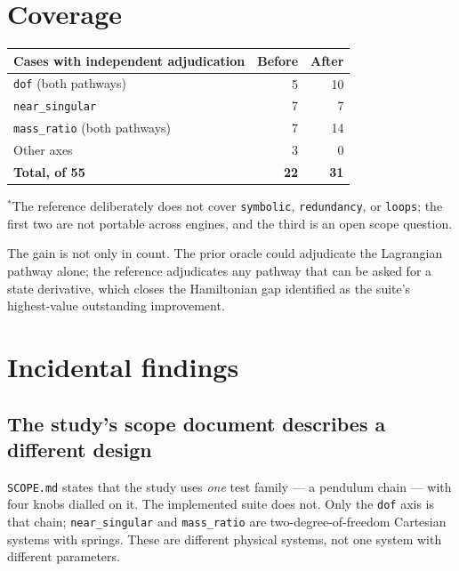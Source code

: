 \documentclass[11pt,a4paper]{article}
\begin{document}
\section{Coverage}

\begin{center}
\begin{tabular}{@{}lrr@{}}
\toprule
\textbf{Cases with independent adjudication} & \textbf{Before} & \textbf{After} \\
\midrule
\texttt{dof} (both pathways)            & 5  & 10 \\
\texttt{near\_singular}                  & 7  & 7 \\
\texttt{mass\_ratio} (both pathways)     & 7  & 14 \\
Other axes                               & 3  & 0\rlap{$^{*}$} \\
\midrule
\textbf{Total, of 55}                    & \textbf{22} & \textbf{31} \\
\bottomrule
\end{tabular}
\end{center}

{\footnotesize $^{*}$The reference deliberately does not cover
\texttt{symbolic}, \texttt{redundancy}, or \texttt{loops}; the first two are
not portable across engines, and the third is an open scope question.}

\medskip
\noindent The gain is not only in count. The prior oracle could adjudicate the
Lagrangian pathway alone; the reference adjudicates any pathway that can be
asked for a state derivative, which closes the Hamiltonian gap identified as
the suite's highest-value outstanding improvement.

\section{Incidental findings}\label{sec:incidental}

\subsection{The study's scope document describes a different design}
\label{sec:scope-finding}

\texttt{SCOPE.md} states that the study uses \emph{one} test family --- a
pendulum chain --- with four knobs dialled on it. The implemented suite does
not. Only the \texttt{dof} axis is that chain; \texttt{near\_singular} and
\texttt{mass\_ratio} are two-degree-of-freedom Cartesian systems with springs.
These are different physical systems, not one system with different parameters.
\end{document}
